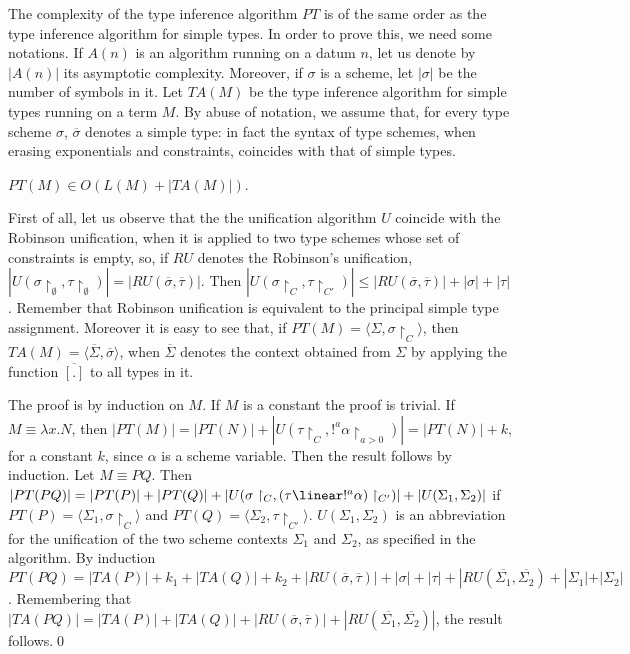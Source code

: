 \noindent The complexity of the type inference algorithm $PT$ is of
the same order as the type inference algorithm for simple types. In
order to prove this, we need some notations.  If $A(n)$ is an
algorithm running on a datum $n$, let us denote by $|A(n)|$ its
asymptotic complexity.  Moreover, if $\sigma$ is a scheme, let
$|\sigma | $ be the number of symbols in it.  Let $\mathit{TA}(M)$ be
the type inference algorithm for simple types running on a term
$M$. By abuse of notation, we assume that, for every type scheme
$\sigma$, $\overline{\sigma}$ denotes a simple type: in fact the
syntax of type schemes, when erasing exponentials and constraints,
coincides with that of simple types.
\begin{thm}[Complexity]
$PT(M) \in \mathit{O}(L(M)+|\mathit{TA}(M)|)$.
\end{thm}
\proof
First of all, let us observe that the the unification algorithm $U$ coincide with the Robinson unification, when it is applied to two type schemes
whose set of constraints is empty, so, if $RU$ denotes the Robinson's unification, 
$|U(\sigma \restriction_{\emptyset},
\tau \restriction_{\emptyset} )|=|RU (\overline{\sigma},\overline{\tau})|$. 
Then 
$|U( \sigma\restriction_{C} , 
  \tau\restriction_{C'})|\leq |RU(\overline{\sigma},\overline{\tau})| +|\sigma | + |\tau |$.
Remember that Robinson unification is equivalent to the principal simple type assignment.
Moreover it is easy to see that, if $PT(M)=\langle \Sigma, \sigma \restriction_{C} \rangle$, then 
$\mathit{TA}(M)=\langle\overline{\Sigma}, \overline{\sigma}\rangle$, when $\overline{\Sigma}$ denotes the context obtained 
from $\Sigma$ by applying the function $\overline{[.]}$ to all types in it.

The proof is by induction on $M$. If $M $ is a constant the proof is trivial.
If $M \equiv \lambda x. N$, then $|PT(M)|= |PT(N)| + |U(\tau\restriction_{C}, !^{a}\alpha \restriction_{a>0})| =
|PT(N)| + k$, for a constant $k$, since $\alpha$ is a scheme variable. Then the result follows by induction.
Let $M\equiv PQ$. Then $|PT(PQ)| = |PT(P)| + |PT(Q)| + |U(\sigma\restriction_{C}, 
  (\tau\linear !^{a}\alpha)\restriction_{C'})| + |U(\Sigma_{1},\Sigma_{2})|$ 
if $PT(P)=\langle \Sigma_{1},\sigma\restriction_{C} \rangle$ and 
  $PT(Q)=\langle \Sigma_{2},\tau\restriction_{C'}\rangle $. $U(\Sigma_{1},\Sigma_{2})$ is an abbreviation for the unification of the 
  two scheme contexts $\Sigma_{1}$ and $\Sigma_{2}$, as specified in the algorithm. 
 By induction $PT(PQ)= |\mathit{TA}(P)| +k_{1} + |\mathit{TA}(Q)| + k_{2} + |RU(\overline{\sigma},\overline{\tau})| +|\sigma| +|\tau|+
 |RU(\overline{\Sigma_{1}},\overline{\Sigma_{2}}) + |\Sigma_{1}| + |\Sigma_{2}|$.
 Remembering that $|\mathit{TA}(PQ)|= |\mathit{TA}(P)| + |\mathit{TA}(Q)| + |RU(\overline{\sigma},\overline{\tau})| +
 |RU(\overline{\Sigma_{1}},\overline{\Sigma_{2}})|$, the result follows.\qed
 






